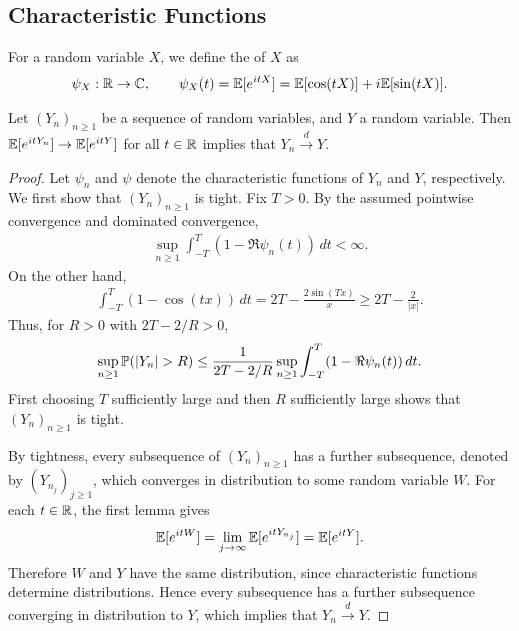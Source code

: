 \subsection{Characteristic Functions}
For a random variable $X$, we define the  of $X$ as
\begin{align}
    \psi_{X}:\mathbb{R} \to \mathbb{C}, \qquad \psi_{X}(t) = \mathbb{E}[e^{itX}] = \mathbb{E}[\cos(tX)] + i\mathbb{E}[\sin(tX)].
\end{align}

\begin{lemma}
    Let $(Y_{n})_{n \geq 1}$ be a sequence of random variables, and $Y$ a random variable. Then $\mathbb{E}[e^{itY_{n}}] \to \mathbb{E}[e^{itY}]$ for all $t \in \mathbb{R}$ implies that $Y_{n} \xrightarrow{d} Y$.
\end{lemma}

\begin{proof}
    Let $\psi_{n}$ and $\psi$ denote the characteristic functions of $Y_{n}$ and $Y$, respectively. We first show that $(Y_{n})_{n\geq 1}$ is tight. Fix $T>0$. By the assumed pointwise convergence and dominated convergence,
    \begin{align}
        \sup_{n\geq 1}\int_{-T}^{T}(1-\Re\psi_{n}(t))\,dt < \infty.
    \end{align}
    On the other hand,
    \begin{align}
        \int_{-T}^{T}(1-\cos(tx))\,dt
        =2T-\frac{2\sin(Tx)}{x}
        \geq 2T-\frac{2}{|x|}.
    \end{align}
    Thus, for $R>0$ with $2T-2/R>0$,
    \begin{align}
        \sup_{n\geq 1}\Prob(|Y_{n}|>R)
        \leq \frac{1}{2T-2/R}\sup_{n\geq 1}\int_{-T}^{T}(1-\Re\psi_{n}(t))\,dt.
    \end{align}
    First choosing $T$ sufficiently large and then $R$ sufficiently large shows that $(Y_{n})_{n\geq 1}$ is tight.

    By tightness, every subsequence of $(Y_{n})_{n\geq 1}$ has a further subsequence, denoted by $(Y_{n_{j}})_{j\geq 1}$, which converges in distribution to some random variable $W$. For each $t\in\mathbb{R}$, the first lemma gives
    \begin{align}
        \mathbb{E}[e^{itW}] = \lim_{j\to\infty}\mathbb{E}[e^{itY_{n_{j}}}] = \mathbb{E}[e^{itY}].
    \end{align}
    Therefore $W$ and $Y$ have the same distribution, since characteristic functions determine distributions. Hence every subsequence has a further subsequence converging in distribution to $Y$, which implies that $Y_{n}\xrightarrow{d}Y$.
\end{proof}

